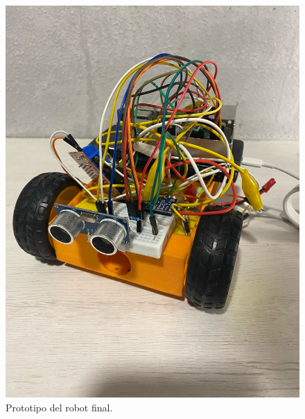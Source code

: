 \begin{figure}[H]
  \centering
  \includegraphics[scale=0.12]{figs/rob} %
  \caption{ Prototipo del robot final.}
  \label{fig:ddd}
\end{figure} 











